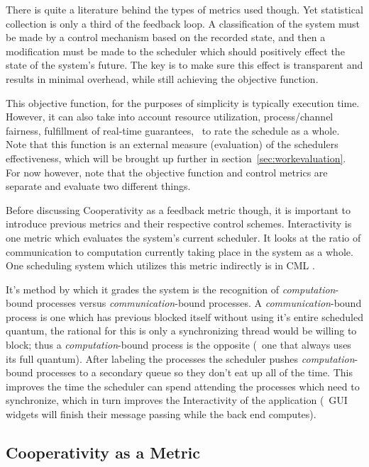 There is quite a literature behind the types of metrics used though. Yet statistical collection is 
only a third of the feedback loop. A classification of the system must be made by a control mechanism based on the 
recorded state, and then a modification must be made to the scheduler which should positively 
effect the state of the system's future. The key is to make sure this effect is transparent and results in minimal
overhead, while still achieving the objective function.

This objective function, for the purposes of simplicity is typically execution time. However, it can also take into
account resource utilization, process/channel fairness, fulfillment of real-time guarantees, \etc~to rate the 
schedule as a whole. Note that this function is an external measure (evaluation) of the schedulers effectiveness,
which will be brought up further in section~\ref{sec:workevaluation}. For now however, note that the objective 
function and control metrics are separate and evaluate two different things.

Before discussing Cooperativity as a feedback metric though, it is important to introduce previous metrics and their
respective control schemes. Interactivity is one metric which evaluates the system's current scheduler. It looks at 
the ratio of communication to computation currently taking place in the system as a whole. One scheduling system which 
utilizes this metric indirectly is in CML \cite{reppy1993concurrent}.

It's method by which it grades the system is the recognition of {\em computation}-bound processes versus
{\em communication}-bound processes. A {\em communication}-bound process is one which has previous blocked itself
without using it's entire scheduled quantum, the rational for this is only a synchronizing thread would be willing
to block; thus a {\em computation}-bound process is the opposite (\ie~one that always uses its full quantum). After
labeling the processes the scheduler pushes {\em computation}-bound processes to a secondary queue so they don't eat
up all of the time. This improves the time the scheduler can spend attending the processes which need to synchronize,
which in turn improves the Interactivity of the application (\ie~GUI widgets will finish their message passing while 
the back end computes).

\subsection{Cooperativity as a Metric}


